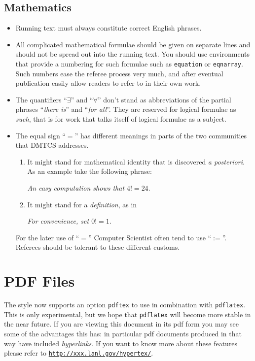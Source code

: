 \documentclass[%
]{algotel}
\begin{document}
\subsection{Mathematics}
\label{sec:math}
\begin{itemize}
\item Running text must always constitute correct English phrases.
  
\item All complicated mathematical formulae should be given on
  separate lines and should not be spread out into the running text.
  You should use \LaTeXe environments that provide a numbering for
  such formulae such as \texttt{equation} or \texttt{eqnarray}. Such
  numbers ease the referee process very much, and after eventual
  publication easily allow readers to refer to in their own work.
  
  
\item The quantifiers ``$\exists$'' and ``$\forall$'' don't stand as
  abbreviations of the partial phrases ``\emph{there is}'' and
  ``\emph{for all}''. They are reserved for logical formulae as
  \emph{such}, that is for work that talks itself of logical
  formulae as a subject.
  
  
\item The equal sign ``$=$'' has different meanings in parts of the
  two communities that DMTCS addresses.
  \begin{enumerate}
  \item It might stand for mathematical identity that is discovered
    \emph{a posteriori}. As an example take the following phrase:
    \begin{center}
      \emph{An easy computation shows that $4!=24$}.
    \end{center}
  \item It might stand for a \emph{definition}, as in
    \begin{center}
      \emph{For convenience, set $0!=1$.}
    \end{center}
  \end{enumerate}
  For the later use of ``$=$'' Computer Scientist often tend to use
  ``$:=$''. Referees should be tolerant to these different customs.
\end{itemize}



\section{PDF Files}
\label{sec:pdf}
The style now supports an option \texttt{pdftex} to use in combination
with \texttt{pdflatex}. This is only experimental, but we hope that
\texttt{pdflatex} will become more stable in the near future. If you
are viewing this document in its pdf form you may see some of the
advantages this has: in particular pdf documents produced in that way
have included \emph{hyperlinks}. If you want to know more about these
features please refer to
\href{http://xxx.lanl.gov/hypertex/}{\texttt{http://xxx.lanl.gov/hypertex/}}.
\end{document}
